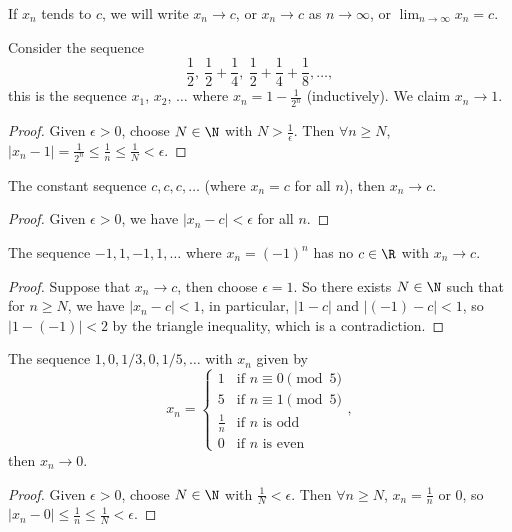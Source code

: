 \documentclass[a4paper]{scrreprt}
\begin{document}
\begin{notation}
	If $x_n$ tends to $c$, we will write $x_n \rightarrow c$, or $x_n \rightarrow c$ as $n \rightarrow \infty$, or $\displaystyle\lim_{n \to \infty} x_n = c$.
\end{notation}

\begin{example}
	Consider the sequence 
	$$\frac{1}{2},\ \frac{1}{2} + \frac{1}{4},\ \frac{1}{2} + \frac{1}{4} + \frac{1}{8}, \dots,$$
	this is the sequence $x_1$, $x_2$, $\dots$ where $x_n = 1 - \frac{1}{2^n}$ (inductively).
	We claim $x_n \rightarrow 1$.
\end{example}
\begin{proof}
	Given $\epsilon > 0$, choose $N \in \N$ with $N > \frac{1}{\epsilon}$. Then $\forall n \geq N$, $|x_n - 1| = \frac{1}{2^n} \leq \frac{1}{n} \leq \frac{1}{N} < \epsilon$.
\end{proof}

\begin{example}
	The constant sequence $c, c, c, \dots$ (where $x_n = c$ for all $n$), then $x_n\rightarrow c$.
\end{example}
\begin{proof}
	Given $\epsilon > 0$, we have $|x_n - c| < \epsilon$ for all $n$.
\end{proof}

\begin{example}
	The sequence $-1, 1, -1, 1, \dots$ where $x_n = (-1)^n$ has no $c \in \R$ with $x_n \rightarrow c$.
\end{example}
\begin{proof}
	Suppose that $x_n \rightarrow c$, then choose $\epsilon = 1$. So there exists $N \in \N$ such that for $n \geq N$, we have $|x_n - c| < 1$, in particular, $|1 - c|$ and $|(-1) - c| < 1$, so $|1 - (-1)| < 2$ by the triangle inequality, which is a contradiction.
\end{proof}

\begin{example}
	The sequence $1, 0, 1/3, 0, 1/5, \dots$ with $x_n$ given by
	$$
	x_n = \begin{cases}
		1 &\mbox{if } n \equiv 0 \pmod{5} \\
	   5 & \mbox{if } n \equiv 1  \pmod{5}\\ 
	   \frac{1}{n} & \mbox{if } n \text{ is odd}\\
	   0 & \mbox{if } n \text{ is even}
	   \end{cases},
	$$
	then $x_n \rightarrow 0$.
\end{example}
\begin{proof}
	Given $\epsilon > 0$, choose $N \in \N$ with $\frac{1}{N} < \epsilon$. Then $\forall n \geq N$, $x_n = \frac{1}{n}$ or 0, so $|x_n - 0| \leq \frac{1}{n} \leq \frac{1}{N} < \epsilon$.
\end{proof}
\end{document}
